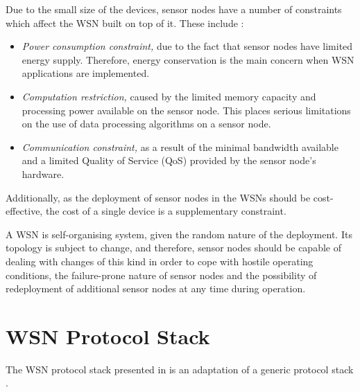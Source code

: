 Due to the small size of the devices, sensor nodes have a number of constraints
which affect the WSN built on top of it. These include \cite{yao:qps}:
\begin{itemize}
  \item \emph{Power consumption constraint,} due to the fact that sensor nodes
  have limited energy supply. Therefore, energy conservation is the main concern when
  WSN applications are implemented.
  \item \emph{Computation restriction,} caused by the limited memory
  capacity and processing power available on the sensor node. This places
  serious limitations on the use of data processing algorithms on a sensor node.
  
  \item \emph{Communication constraint,} as a result of the minimal bandwidth available and a
  limited Quality of Service (QoS) provided by the sensor node's hardware. 
\end{itemize}

Additionally, as the deployment of sensor nodes in the WSNs should be
cost-effective, the cost of a single device is a supplementary constraint.

A WSN is self-organising system, given the random nature of the deployment. Its
topology is subject to change, and therefore, sensor nodes should be capable of
dealing with changes of this kind in order to cope with hostile operating
conditions, the failure-prone nature of sensor nodes and the possibility of
redeployment of additional sensor nodes at any time during operation.

\section{WSN Protocol Stack} \label{sec:WSNProtStack}

The WSN protocol stack presented in \cite{SensorSurveyAkyildiz:2002} is an
adaptation of a generic protocol stack \cite{ComputerNetworksTannenbaum:2003}.



